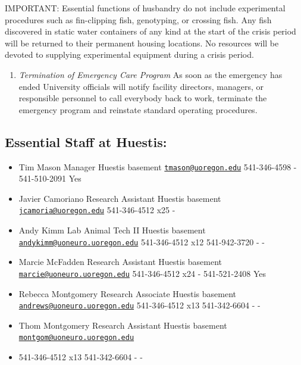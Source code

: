 \documentclass[
]{book}
\providecommand{\tightlist}{%
  \setlength{\itemsep}{0pt}\setlength{\parskip}{0pt}}
\begin{document}
IMPORTANT: Essential functions of husbandry do not include experimental procedures such as fin-clipping fish, genotyping, or crossing fish. Any fish discovered in static water containers of any kind at the start of the crisis period will be returned to their permanent housing locations. No resources will be devoted to supplying experimental equipment during a crisis period.

\begin{enumerate}
\def\labelenumi{\arabic{enumi}.}
\setcounter{enumi}{6}
\tightlist
\item
  \emph{Termination of Emergency Care Program}
  As soon as the emergency has ended University officials will notify facility directors, managers, or responsible personnel to call everybody back to work, terminate the emergency program and reinstate standard operating procedures.
\end{enumerate}

\hypertarget{essential-staff-at-huestis}{%
\subsection{Essential Staff at Huestis:}\label{essential-staff-at-huestis}}

\begin{itemize}
\tightlist
\item
  Tim Mason Manager Huestis basement \href{mailto:tmason@uoregon.edu}{\nolinkurl{tmason@uoregon.edu}} 541-346-4598 - 541-510-2091 Yes
\item
  Javier Camoriano Research Assistant Huestis basement \href{mailto:jcamoria@uoregon.edu}{\nolinkurl{jcamoria@uoregon.edu}} 541-346-4512 x25 -\\
\item
  Andy Kimm Lab Animal Tech II Huestis basement \href{mailto:andykimm@uoneuro.uoregon.edu}{\nolinkurl{andykimm@uoneuro.uoregon.edu}} 541-346-4512 x12 541-942-3720 - -
\item
  Marcie McFadden Research Assistant Huestis basement \href{mailto:marcie@uoneuro.uoregon.edu}{\nolinkurl{marcie@uoneuro.uoregon.edu}} 541-346-4512 x24 - 541-521-2408 Yes
\item
  Rebecca Montgomery Research Associate Huestis basement \href{mailto:andrews@uoneuro.uoregon.edu}{\nolinkurl{andrews@uoneuro.uoregon.edu}} 541-346-4512 x13 541-342-6604 - -
\item
  Thom Montgomery Research Assistant Huestis basement \href{mailto:montgom@uoneuro.uoregon.edu}{\nolinkurl{montgom@uoneuro.uoregon.edu}}
\item
  541-346-4512 x13 541-342-6604 - -
\end{itemize}
\end{document}
